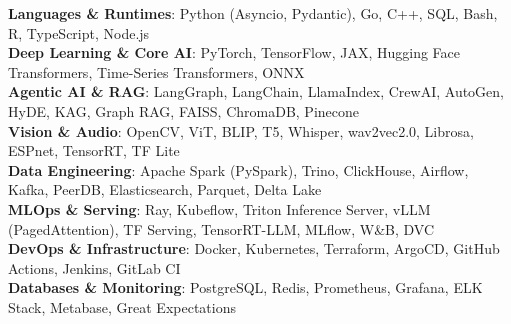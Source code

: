 \begin{itemize}[leftmargin=0.15in, label={}]
  \small{\item{
    \textbf{Languages \& Runtimes}{: Python (Asyncio, Pydantic), Go, C++, SQL, Bash, R, TypeScript, Node.js} \\
    \textbf{Deep Learning \& Core AI}{: PyTorch, TensorFlow, JAX, Hugging Face Transformers, Time-Series Transformers, ONNX} \\
    \textbf{Agentic AI \& RAG}{: LangGraph, LangChain, LlamaIndex, CrewAI, AutoGen, HyDE, KAG, Graph RAG, FAISS, ChromaDB, Pinecone} \\
    \textbf{Vision \& Audio}{: OpenCV, ViT, BLIP, T5, Whisper, wav2vec2.0, Librosa, ESPnet, TensorRT, TF Lite} \\
    \textbf{Data Engineering}{: Apache Spark (PySpark), Trino, ClickHouse, Airflow, Kafka, PeerDB, Elasticsearch, Parquet, Delta Lake} \\
    \textbf{MLOps \& Serving}{: Ray, Kubeflow, Triton Inference Server, vLLM (PagedAttention), TF Serving, TensorRT-LLM, MLflow, W\&B, DVC} \\
    \textbf{DevOps \& Infrastructure}{: Docker, Kubernetes, Terraform, ArgoCD, GitHub Actions, Jenkins, GitLab CI} \\
    \textbf{Databases \& Monitoring}{: PostgreSQL, Redis, Prometheus, Grafana, ELK Stack, Metabase, Great Expectations}
  }}
\end{itemize}
